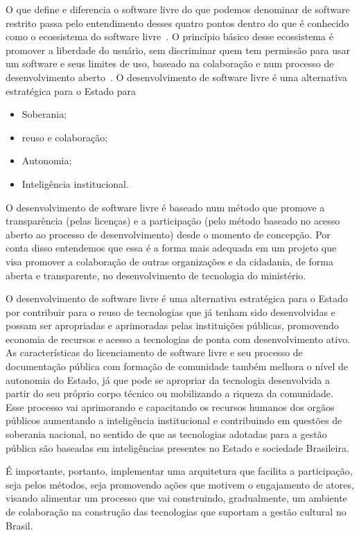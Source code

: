 O que define e diferencia o software livre do que podemos denominar de software
restrito passa pelo entendimento desses quatro pontos dentro do que é conhecido
como o ecossistema do software livre~\cite{meirelles2013}. O princípio básico 
desse ecossistema é promover a liberdade do usuário, sem
discriminar quem tem permissão para usar um software e seus limites de uso,
baseado na colaboração e num processo de desenvolvimento
aberto~\cite{kon2011jai}. O desenvolvimento de software livre é uma alternativa estratégica
para o Estado para
\begin{itemize}
 \item Soberania;
 \item reuso e colaboração;
 \item Autonomia;
 \item Inteligência institucional.
\end{itemize}

O desenvolvimento de software livre é baseado num método que promove a transparência (pelas licenças) e a participação
(pelo método baseado no acesso aberto ao processo de desenvolvimento) desde o momento de concepção. Por conta disso entendemos 
que essa é a forma mais adequada em um projeto que visa promover a colaboração de outras organizações e da cidadania, 
de forma aberta e transparente, no desenvolvimento de tecnologia do ministério.

O desenvolvimento de software livre é uma alternativa estratégica para o Estado por contribuir para o reuso de tecnologias que já
tenham sido desenvolvidas e possam ser apropriadas e aprimoradas pelas instituições públicas, promovendo economia de recursos e acesso a
tecnologias de ponta com desenvolvimento ativo. As características do licenciamento de software livre e seu processo de documentação pública com formação de comunidade também melhora o nível de autonomia do Estado, já que pode se apropriar da tecnologia desenvolvida a partir do seu próprio corpo técnico ou mobilizando a riqueza da comunidade. Esse processo vai aprimorando e capacitando os recursos humanos dos orgãos públicos aumentando a inteligência institucional e contribuindo em questões de soberania nacional, no sentido de que as tecnologias adotadas para a gestão pública são baseadas em inteligências presentes no Estado e sociedade Brasileira.

É importante, portanto, implementar uma arquitetura que facilita a participação, seja pelos métodos, seja promovendo ações que motivem o engajamento de atores, visando alimentar um processo que vai construindo, gradualmente, um ambiente de colaboração na construção das tecnologias que suportam a gestão cultural no Brasil.

